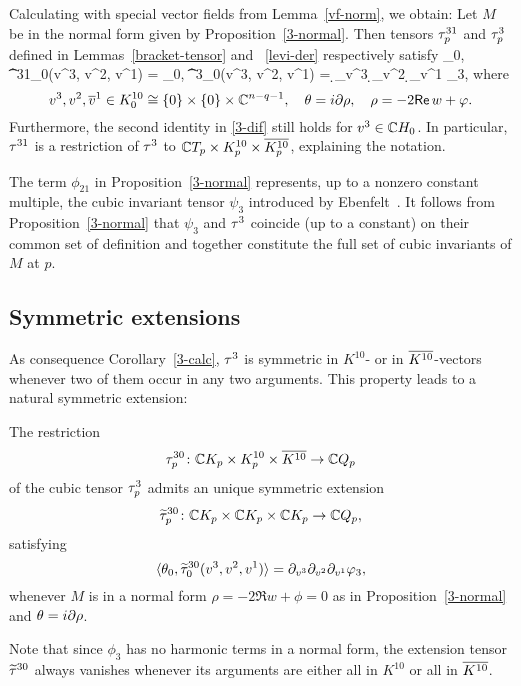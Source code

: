 \documentclass[12pt]{amsart}
\begin{document}
Calculating with special vector fields from Lemma~\ref{vf-norm}, we obtain:
\bc{}
Let $M$ be in the normal form given by Proposition~\ref{3-normal}.
Then tensors $\tau^{31}_p$ and $\tau^3_p$ defined in Lemmas~\ref{bracket-tensor}
and ~\ref{levi-der} respectively satisfy
\beq{}
	\la \th_0,  \t^{31}_0(v^3, v^2, v^1) \ra
	=
	\la \th_0,  \t^3_0(v^3, v^2, v^1) \ra
	= \d_{v^3} \d_{v^2} \d_{v^1} \phi_3,
\eeq
where
$$
	v^3, v^2, \overline{v}^1 \in K^{10}_0 \cong \{0\}\times \{0\} \times {\mathbb{C}}^{n-q-1},
	\quad
	\theta=i \partial\rho, 
	\quad
	\rho =-2{\sf Re}\, w + \varphi.
$$
Furthermore, the second identity in \eqref{3-dif} still holds for $v^3\in {\mathbb{C}} H_0$.
\ec
In particular,
$\tau^{31}$ is a restriction of $\tau^3$ 
to ${\mathbb{C}} T_p \times  K^{10}_p \times \overline{K^{10}_p}$,
explaining the notation.


\br
The term $\phi_{21}$ in Proposition~\ref{3-normal}
represents, up to a nonzero constant multiple,
the cubic invariant tensor 
$\psi_3$ 
introduced by Ebenfelt~\cite{E-jdg}.
It follows from Proposition~\ref{3-normal}
that $\psi_3$ and $\tau^3$
coincide (up to a constant) on their common set of definition
and together
constitute the full set of cubic invariants of $M$ at $p$.
\er



\subsection{Symmetric extensions}
As consequence Corollary~\ref{3-calc},
$\tau^3$ is symmetric in
$K^{10}$- or in $\overline{K^{10}}$-vectors
whenever two of them occur in any two arguments.
This property leads to a natural symmetric extension:

\bl{}
The restriction 
$$
	\tau^{30}_p \colon {\mathbb{C}} K_p \times K^{10}_p\times \overline{K^{10}} \to {\mathbb{C}} Q_p
$$ 
of the cubic tensor $\tau^3_p$
 admits an unique symmetric extension
$$
	\widetilde{\tau}^{30}_p \colon
	{\mathbb{C}} K_p \times {\mathbb{C}} K_p \times {\mathbb{C}} K_p \to {\mathbb{C}} Q_p,
$$
satisfying
$$
	\langle \theta_0,  \widetilde{\tau}^{30}_0(v^3, v^2, v^1) \rangle
	= \partial_{v^3} \partial_{v^2} \partial_{v^1} \varphi_3,
$$
whenever $M$ is in a normal form $\rho= -2\Re w +\phi=0$
as in Proposition~\ref{3-normal}
and $\theta = i\partial\rho$.
\el

\br
Note that since $\phi_3$ has no harmonic terms in a normal form,
the extension tensor $\widetilde{\tau}^{30}$ 
always vanishes whenever its arguments
are either all in $K^{10}$ or all in $\overline{K^{10}}$.
\er
\end{document}
